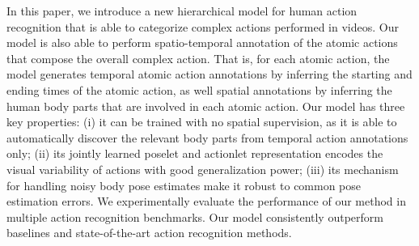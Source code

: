In this paper, we introduce a new hierarchical model for human action
recognition that is able to categorize complex actions performed in videos.
Our model is also able to perform spatio-temporal annotation of the atomic
actions that compose the overall complex action. That is, for each atomic
action, the model generates temporal atomic action annotations by
inferring the starting and ending times of the atomic action, as well
spatial annotations by inferring the human body parts that are involved
in each atomic action. Our model has three key properties:
(i) it can be trained with no spatial
supervision, as it is able to automatically discover the relevant body parts
from temporal action annotations only;
(ii) its jointly learned poselet and actionlet representation encodes the
visual variability of actions with good generalization power;
(iii) its mechanism for handling noisy body pose estimates make it robust to
common pose estimation errors.
We experimentally evaluate the performance of our method in multiple
action recognition benchmarks. Our model consistently outperform baselines
and state-of-the-art action recognition methods. 

